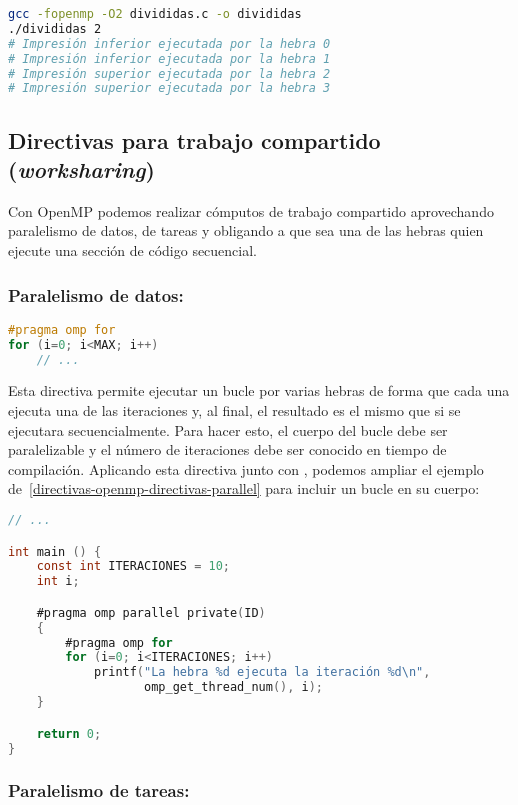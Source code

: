 \pagebreak

\begin{lstlisting}[language=sh]
gcc -fopenmp -O2 divididas.c -o divididas
./divididas 2
# Impresión inferior ejecutada por la hebra 0
# Impresión inferior ejecutada por la hebra 1
# Impresión superior ejecutada por la hebra 2
# Impresión superior ejecutada por la hebra 3
\end{lstlisting}

\subsection{Directivas para trabajo compartido (\textit{worksharing})}\label{directivas-openmp-directivas-trabajo-compartido}

Con OpenMP podemos realizar cómputos de trabajo compartido aprovechando paralelismo de datos, de tareas y obligando a que sea una de las hebras quien ejecute una sección de código secuencial.

\subsubsection{Paralelismo de datos: }

\begin{lstlisting}[language=C]
#pragma omp for
for (i=0; i<MAX; i++)
	// ...
\end{lstlisting}

Esta directiva permite ejecutar un bucle  por varias hebras de forma que cada una ejecuta una de las iteraciones y, al final, el resultado es el mismo que si se ejecutara secuencialmente.
Para hacer esto, el cuerpo del bucle debe ser paralelizable y el número de iteraciones debe ser conocido en tiempo de compilación.
Aplicando esta directiva junto con , podemos ampliar el ejemplo de~\ref{directivas-openmp-directivas-parallel} para incluir un bucle en su cuerpo:

\begin{lstlisting}[language=C]
// ...

int main () {
	const int ITERACIONES = 10;
	int i;

	#pragma omp parallel private(ID)
	{
		#pragma omp for
		for (i=0; i<ITERACIONES; i++)
			printf("La hebra %d ejecuta la iteración %d\n",
			       omp_get_thread_num(), i);
	}

	return 0;
}
\end{lstlisting}

\subsubsection{Paralelismo de tareas: }

